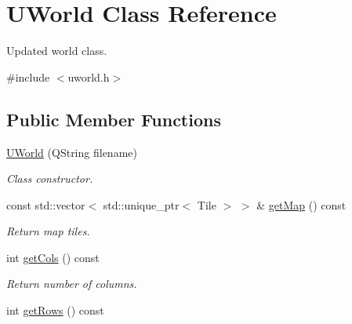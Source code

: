 \hypertarget{classUWorld}{}\section{U\+World Class Reference}
\label{classUWorld}


Updated world class.  




{\ttfamily \#include $<$uworld.\+h$>$}

\subsection*{Public Member Functions}
\begin{DoxyCompactItemize}
\item 
\hyperlink{classUWorld_a4336a8896885a7ce345b13a142902dd5}{U\+World} (Q\+String filename)
\begin{DoxyCompactList}\small\item\em Class constructor. \end{DoxyCompactList}\item 
const std\+::vector$<$ std\+::unique\+\_\+ptr$<$ Tile $>$ $>$ \& \hyperlink{classUWorld_a5903b82b41401b80f6f0a7b10f4a7f9e}{get\+Map} () const \hypertarget{classUWorld_a5903b82b41401b80f6f0a7b10f4a7f9e}{}\label{classUWorld_a5903b82b41401b80f6f0a7b10f4a7f9e}

\begin{DoxyCompactList}\small\item\em Return map tiles. \end{DoxyCompactList}\item 
int \hyperlink{classUWorld_a4664a9e8e2b77b3f5be4674a81c09519}{get\+Cols} () const \hypertarget{classUWorld_a4664a9e8e2b77b3f5be4674a81c09519}{}\label{classUWorld_a4664a9e8e2b77b3f5be4674a81c09519}

\begin{DoxyCompactList}\small\item\em Return number of columns. \end{DoxyCompactList}\item 
int \hyperlink{classUWorld_a92045ebff66f4ddb7435cff51a9bd9e6}{get\+Rows} () const \hypertarget{classUWorld_a92045ebff66f4ddb7435cff51a9bd9e6}{}\label{classUWorld_a92045ebff66f4ddb7435cff51a9bd9e6}


\end{DoxyCompactItemize}
